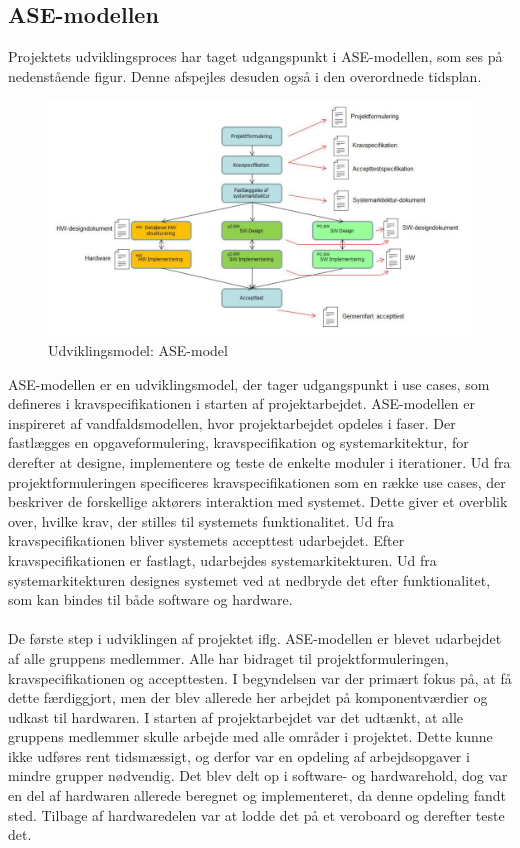 \subsection{ASE-modellen}
Projektets udviklingsproces har taget udgangspunkt i ASE-modellen, som ses på nedenstående figur. Denne afspejles desuden også i den overordnede tidsplan. 
\begin{figure}[H]
	\centering
	\includegraphics[width=1\textwidth]{Figurer/asemodel}
	\caption{Udviklingsmodel: ASE-model \protect\cite[s. 6]{Vejledning}}
\end{figure}
ASE-modellen er en udviklingsmodel, der tager udgangspunkt i use cases, som defineres i kravspecifikationen i starten af projektarbejdet. ASE-modellen er inspireret af vandfaldsmodellen, hvor projektarbejdet opdeles i faser. Der fastlægges en opgaveformulering, kravspecifikation og systemarkitektur, for derefter at designe, implementere og teste de enkelte moduler i iterationer. Ud fra projektformuleringen specificeres kravspecifikationen som en række use cases, der beskriver de forskellige aktørers interaktion med systemet. Dette giver et overblik over, hvilke krav, der stilles til systemets funktionalitet. Ud fra kravspecifikationen bliver systemets accepttest udarbejdet. Efter kravspecifikationen er fastlagt, udarbejdes systemarkitekturen. Ud fra systemarkitekturen designes systemet ved at nedbryde det efter funktionalitet, som kan bindes til både software og hardware. \\\\
De første step i udviklingen af projektet iflg. ASE-modellen er blevet udarbejdet af alle gruppens medlemmer. Alle har bidraget til projektformuleringen, kravspecifikationen og accepttesten. I begyndelsen var der primært fokus på, at få dette færdiggjort, men der blev allerede her arbejdet på komponentværdier og udkast til hardwaren. I starten af projektarbejdet var det udtænkt, at alle gruppens medlemmer skulle arbejde med alle områder i projektet. Dette kunne ikke udføres rent tidsmæssigt, og derfor var en opdeling af arbejdsopgaver i mindre grupper nødvendig. Det blev delt op i software- og hardwarehold, dog var en del af hardwaren allerede beregnet og implementeret, da denne opdeling fandt sted. Tilbage af hardwaredelen var at lodde det på et veroboard og derefter teste det.\\\\

